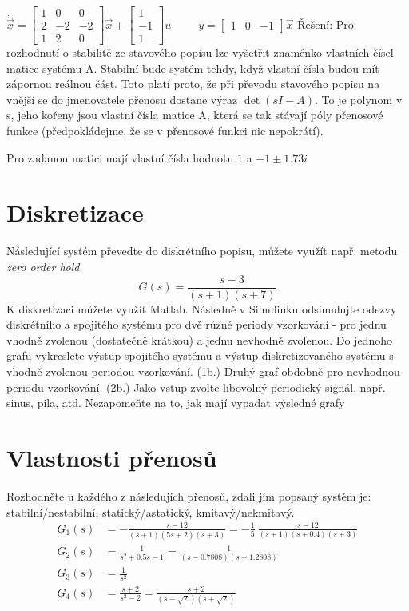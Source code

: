 \documentclass[twoside]{article}
\begin{document}
\begin{math}
	\dot{\vec{x}} = \begin{bmatrix}
		1 & 0 & 0 \\
		2 & -2 & -2 \\
		1 & 2 & 0
	\end{bmatrix} \vec{x} + \begin{bmatrix}
		1 \\
		-1 \\
		1
\end{bmatrix} u ~~~~~~~~~~~
y = \begin{bmatrix}
	1 & 0 & -1
\end{bmatrix} \vec{x}
\end{math}
Řešení: Pro rozhodnutí o stabilitě ze stavového popisu lze vyšetřit znaménko vlastních čísel matice systému A.
Stabilní bude systém tehdy, když vlastní čísla budou mít zápornou reálnou část. Toto platí proto, že při převodu
stavového popisu na vnější se do jmenovatele přenosu dostane výraz $\det(sI - A)$. To je polynom v s, jeho kořeny
jsou vlastní čísla matice A, která se tak stávají póly přenosové funkce (předpokládejme, že se v přenosové funkci nic nepokrátí).

Pro zadanou matici mají vlastní čísla hodnotu $1$ a $ -1 \pm 1.73 i$ 


\section{Diskretizace}
\label{sec:ukol7}
Následující systém převeďte do diskrétního popisu, můžete využít např. metodu \textit{zero order hold}.
\begin{equation}
	G(s) = \frac{s-3}{(s+1)(s+7)}
\end{equation}
K diskretizaci můžete využít Matlab. Následně v Simulinku odsimulujte odezvy diskrétního a spojitého systému
pro dvě různé periody vzorkování - pro jednu vhodně zvolenou (dostatečně krátkou) a jednu nevhodně zvolenou.
Do jednoho grafu vykreslete výstup spojitého systému a výstup diskretizovaného systému s vhodně zvolenou
periodou vzorkování. (1b.) Druhý graf obdobně pro nevhodnou periodu vzorkování. (2b.) Jako vstup zvolte
libovolný periodický signál, např. sinus, pila, atd. Nezapomeňte na to, jak mají vypadat výsledné grafy

\section{Vlastnosti přenosů}
\label{sec:ukol8}
Rozhodněte u každého z následujích přenosů, zdali jím popsaný systém je: stabilní/nestabilní, statický/astatický, kmitavý/nekmitavý.
\begin{equation*}
	\begin{split}
		G_1(s) &= -\frac{s-12}{(s+1)(5s+2)(s+3)} = -\frac{1}{5}~\frac{s-12}{(s+1)(s+0.4)(s+3)} \\
		G_2(s) &= \frac{1}{s^2 + 0.5s - 1} = \frac{1}{(s-0.7808)(s+1.2808)} \\
		G_3(s) &= \frac{1}{s^2} \\
		G_4(s) &= \frac{s+2}{s^2-2} = \frac{s+2}{(s-\sqrt{2})(s+\sqrt{2})}
	\end{split}
\end{equation*}
\end{document}
